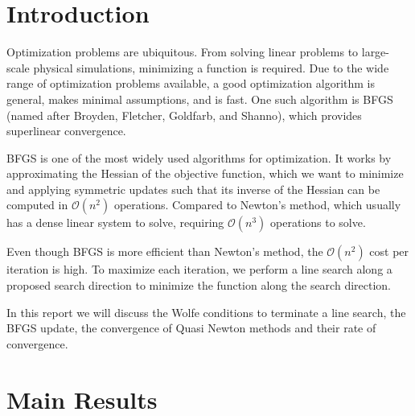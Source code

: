 \documentclass[12pt]{report}
\begin{document}
\tableofcontents
{}
\newpage
\listoffigures
{}
\newpage
\listoftables
{}
\newpage
\renewcommand{\thepage}{\arabic{page}}
\setcounter{page}{1}

\chapter{Introduction}
Optimization problems are ubiquitous. From solving linear problems to large-scale physical simulations, minimizing a function is required. Due to the wide range of optimization problems available, a good optimization algorithm is general, makes minimal assumptions, and is fast. One such algorithm is BFGS (named after Broyden, Fletcher, Goldfarb, and Shanno), which provides superlinear convergence.

BFGS is one of the most widely used algorithms for optimization. It works by approximating the Hessian of the objective function, which we want to minimize and applying symmetric updates such that its inverse of the Hessian can be computed in $\mathcal{O}(n^2)$ operations. Compared to Newton's method, which usually has a dense linear system to solve, requiring $\mathcal O(n^3)$ operations to solve.

Even though BFGS is more efficient than Newton's method, the $ \mathcal O(n^2)$ cost per iteration is high. To maximize each iteration, we perform a line search along a proposed search direction to minimize the function along the search direction.

In this report we will discuss the Wolfe conditions to terminate a line search, the BFGS update, the convergence of Quasi Newton methods and their rate of convergence.

\chapter{Main Results}
\end{document}
